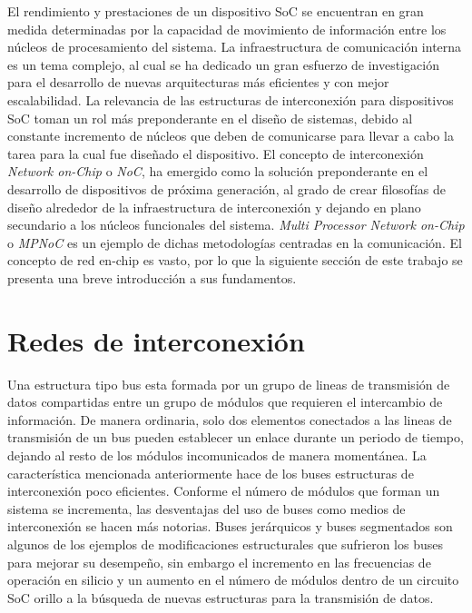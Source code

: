 El rendimiento y prestaciones de un dispositivo SoC se encuentran en gran medida determinadas por la capacidad de movimiento de información entre los núcleos de procesamiento del sistema. La infraestructura de comunicación interna es un tema complejo, al cual se ha dedicado un gran esfuerzo de investigación para el desarrollo de nuevas arquitecturas más eficientes y con mejor escalabilidad. La relevancia de las estructuras de interconexión para dispositivos SoC toman un rol más preponderante en el diseño de sistemas, debido al constante incremento de núcleos que deben de comunicarse para llevar a cabo la tarea para la cual fue diseñado el dispositivo. El concepto de interconexión \textit{Network on-Chip} o \textit{NoC}, ha emergido como la solución preponderante en el desarrollo de dispositivos de próxima generación, al grado de crear filosofías de diseño alrededor de la infraestructura de interconexión y dejando en plano secundario a los núcleos funcionales del sistema. \textit{Multi Processor Network on-Chip} o \textit{MPNoC} es un ejemplo de dichas metodologías centradas en la comunicación. El concepto de red en-chip es vasto, por lo que la siguiente sección de este trabajo se presenta una breve introducción a sus fundamentos.

\section{Redes de interconexión}\label{sec:redes_de_interconexion}

Una estructura tipo bus esta formada por un grupo de lineas de transmisión de datos compartidas entre un grupo de módulos que requieren el intercambio de información. De manera ordinaria, solo dos elementos conectados a las lineas de transmisión de un bus pueden establecer un enlace durante un periodo de tiempo, dejando al resto de los módulos incomunicados de manera momentánea. La característica mencionada anteriormente hace de los buses estructuras de interconexión poco eficientes. Conforme el número de módulos que forman un sistema se incrementa, las desventajas del uso de buses como medios de interconexión se hacen más notorias. Buses jerárquicos\cite{chapter1:100306} y buses segmentados\cite{chapter1:797400} son algunos de los ejemplos de modificaciones estructurales que sufrieron los buses para mejorar su desempeño, sin embargo el incremento en las frecuencias de operación en silicio y un aumento en el número de módulos dentro de un circuito SoC orillo a la búsqueda de nuevas estructuras para la transmisión de datos.

